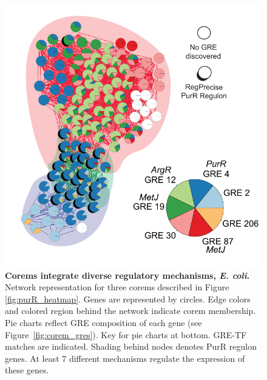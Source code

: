 \begin{figure}[hp]
\centering
\includegraphics[width=0.95\linewidth]{figures/purR_network.pdf}
\caption[Corems integrate diverse regulatory mechanisms, \textit{E. coli}]{\textbf{Corems integrate diverse regulatory mechanisms, \textit{E. coli}.} Network representation for three corems described in Figure \ref{fig:purR_heatmap}. Genes are represented by circles. Edge colors and colored region behind the network indicate corem membership. Pie charts reflect GRE composition of each gene (see Figure~\ref{fig:corem_gres}). Key for pie charts at bottom. GRE-TF matches are indicated. Shading behind nodes denotes PurR regulon genes. At least 7 different mechanisms regulate the expression of these genes.}
\label{fig:purR_network}
\end{figure}


